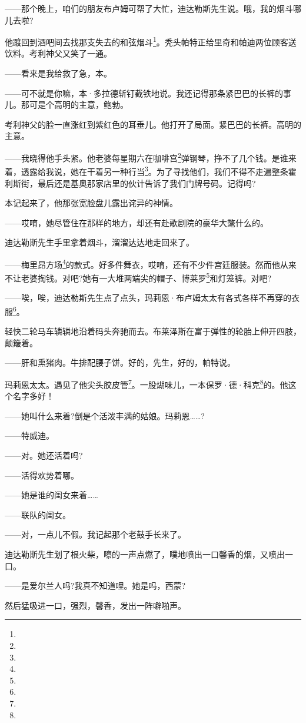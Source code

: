 \par ——那个晚上，咱们的朋友布卢姆可帮了大忙，迪达勒斯先生说。哦，我的烟斗哪儿去啦?
\par 他踱回到酒吧间去找那支失去的和弦烟斗\footnote{}。秃头帕特正给里奇和帕迪两位顾客送饮料。考利神父又笑了一通。
\par ——看来是我给救了急，本。
\par ——可不就是你嘛，本·多拉德斩钉截铁地说。我还记得那条紧巴巴的长裤的事儿。那可是个高明的主意，鲍勃。
\par 考利神父的脸一直涨红到紫红色的耳垂儿。他打开了局面。紧巴巴的长裤。高明的主意。
\par ——我晓得他手头紧。他老婆每星期六在咖啡宫\footnote{}弹钢琴，挣不了几个钱。是谁来着，透露给我说，她在干着另一种行当\footnote{}。为了寻找他们，我们不得不走遍整条霍利斯街，最后还是基奥那家店里的伙计告诉了我们门牌号码。记得吗?
\par 本记起来了，他那张宽脸盘儿露出诧异的神情。
\par ——哎唷，她尽管住在那样的地方，却还有赴歌剧院的豪华大氅什么的。
\par 迪达勒斯先生手里拿着烟斗，溜溜达达地走回来了。
\par ——梅里昂方场\footnote{}的款式。好多件舞衣，哎唷，还有不少件宫廷服装。然而他从来不让老婆掏钱。对吧?她有一大堆两端尖的帽子、博莱罗\footnote{}和灯笼裤。对吧?
\par ——唉，唉，迪达勒斯先生点了点头，玛莉恩·布卢姆太太有各式各样不再穿的衣服\footnote{}。
\par 轻快二轮马车辚辚地沿着码头奔驰而去。布莱泽斯在富于弹性的轮胎上伸开四肢，颠簸着。
\par ——肝和熏猪肉。牛排配腰子饼。好的，先生，好的，帕特说。
\par 玛莉恩太太。遇见了他尖头胶皮管\footnote{}。一股煳味儿，一本保罗·德·科克\footnote{}的。他这个名字多好！
\par ——她叫什么来着?倒是个活泼丰满的姑娘。玛莉恩……?
\par ——特威迪。
\par ——对。她还活着吗?
\par ——活得欢势着哪。
\par ——她是谁的闺女来着……
\par ——联队的闺女。
\par ——对，一点儿不假。我记起那个老鼓手长来了。
\par 迪达勒斯先生划了根火柴，嚓的一声点燃了，噗地喷出一口馨香的烟，又喷出一口。
\par ——是爱尔兰人吗?我真不知道哩。她是吗，西蒙?
\par 然后猛吸进一口，强烈，馨香，发出一阵噼啪声。
